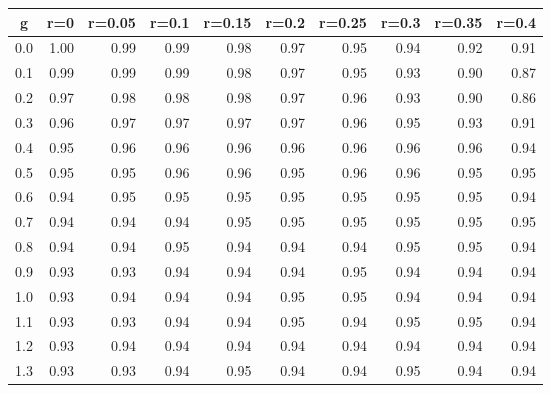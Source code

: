 %
\begin{table}[!tbp]
 \begin{center}
 \begin{tabular}{rrrrrrrrrr}\hline\hline
\multicolumn{1}{c}{g}&\multicolumn{1}{c}{r=0}&\multicolumn{1}{c}{r=0.05}&\multicolumn{1}{c}{r=0.1}&\multicolumn{1}{c}{r=0.15}&\multicolumn{1}{c}{r=0.2}&\multicolumn{1}{c}{r=0.25}&\multicolumn{1}{c}{r=0.3}&\multicolumn{1}{c}{r=0.35}&\multicolumn{1}{c}{r=0.4}\tabularnewline
\hline
0.0&1.00&0.99&0.99&0.98&0.97&0.95&0.94&0.92&0.91\tabularnewline
0.1&0.99&0.99&0.99&0.98&0.97&0.95&0.93&0.90&0.87\tabularnewline
0.2&0.97&0.98&0.98&0.98&0.97&0.96&0.93&0.90&0.86\tabularnewline
0.3&0.96&0.97&0.97&0.97&0.97&0.96&0.95&0.93&0.91\tabularnewline
0.4&0.95&0.96&0.96&0.96&0.96&0.96&0.96&0.96&0.94\tabularnewline
0.5&0.95&0.95&0.96&0.96&0.95&0.96&0.96&0.95&0.95\tabularnewline
0.6&0.94&0.95&0.95&0.95&0.95&0.95&0.95&0.95&0.94\tabularnewline
0.7&0.94&0.94&0.94&0.95&0.95&0.95&0.95&0.95&0.95\tabularnewline
0.8&0.94&0.94&0.95&0.94&0.94&0.94&0.95&0.95&0.94\tabularnewline
0.9&0.93&0.93&0.94&0.94&0.94&0.95&0.94&0.94&0.94\tabularnewline
1.0&0.93&0.94&0.94&0.94&0.95&0.95&0.94&0.94&0.94\tabularnewline
1.1&0.93&0.93&0.94&0.94&0.95&0.94&0.95&0.95&0.94\tabularnewline
1.2&0.93&0.94&0.94&0.94&0.94&0.94&0.94&0.94&0.94\tabularnewline
1.3&0.93&0.93&0.94&0.95&0.94&0.94&0.95&0.94&0.94\tabularnewline
\hline
\end{tabular}

\end{center}

\end{table}

